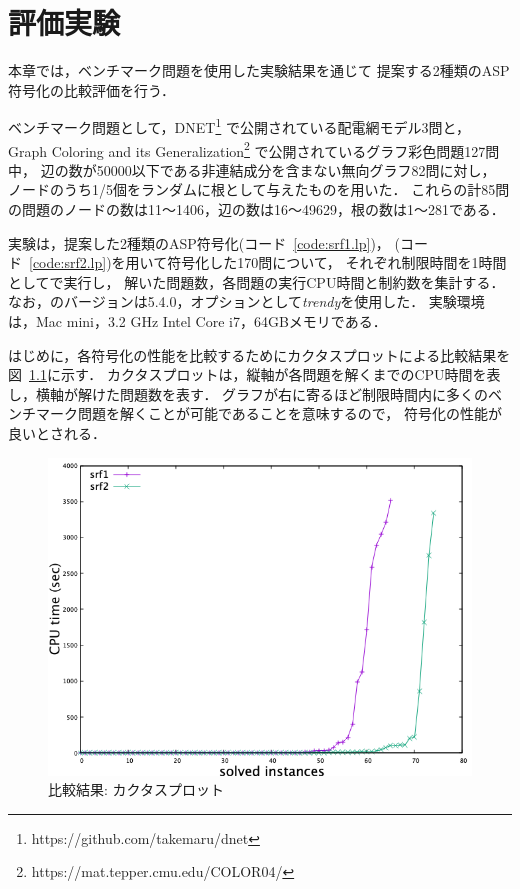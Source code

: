 \chapter{評価実験} \label{chap:exp}

本章では，ベンチマーク問題を使用した実験結果を通じて
提案する2種類のASP符号化の比較評価を行う．

ベンチマーク問題として，DNET\footnote{https://github.com/takemaru/dnet}
で公開されている配電網モデル3問と，
Graph Coloring and its Generalization\footnote{https://mat.tepper.cmu.edu/COLOR04/}
で公開されているグラフ彩色問題127問中，
辺の数が50000以下である非連結成分を含まない無向グラフ82問に対し，
ノードのうち1/5個をランダムに根として与えたものを用いた．
これらの計85問の問題のノードの数は11～1406，辺の数は16～49629，根の数は1～281である．

実験は，提案した2種類のASP符号化(コード~\ref{code:srf1.lp})，
(コード~\ref{code:srf2.lp})を用いて符号化した170問について，
それぞれ制限時間を1時間として{\clingo}で実行し，
解いた問題数，各問題の実行CPU時間と制約数を集計する．
なお，{\clingo}のバージョンは5.4.0，オプションとして\textsl{trendy}を使用した．
実験環境は，Mac mini，3.2 GHz Intel Core i7，64GBメモリである．

はじめに，各符号化の性能を比較するためにカクタスプロットによる比較結果を図~\ref{fig:cactus}に示す．
カクタスプロットは，縦軸が各問題を解くまでのCPU時間を表し，横軸が解けた問題数を表す．
グラフが右に寄るほど制限時間内に多くのベンチマーク問題を解くことが可能であることを意味するので，
符号化の性能が良いとされる．

\begin{figure}[htbp]
 \centering
 \includegraphics[scale=0.5]{fig/cactus.png}
 \caption{比較結果: カクタスプロット} 
 \label{fig:cactus}
\end{figure}


